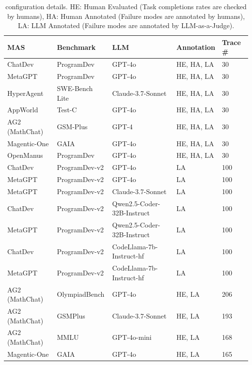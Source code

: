 \begin{table}[ht]
\small
\renewcommand{\arraystretch}{1.3} %
\setlength{\tabcolsep}{3pt} %
\centering
\caption{\dataset{} configuration details. HE: Human Evaluated (Task completions rates are checked by humans), HA: Human Annotated (Failure modes are annotated by humans), LA: LLM Annotated (Failure modes are annotated by LLM-as-a-Judge).}
\label{tab:mad}
\begin{tabular}{p{2.5cm} p{2.5cm} p{4cm} p{2cm} p{1cm}}
    \toprule
    \textbf{MAS} & \textbf{Benchmark} & \textbf{LLM} & \textbf{Annotation} & \textbf{Trace \#} \\
    \toprule
    ChatDev & ProgramDev & GPT-4o & HE, HA, LA & 30 \\
    \hline
    MetaGPT & ProgramDev & GPT-4o & HE, HA, LA & 30 \\
    \hline
    HyperAgent & SWE-Bench Lite & Claude-3.7-Sonnet  & HE, HA, LA & 30 \\
    \hline
    AppWorld & Test-C & GPT-4o & HE, HA, LA & 30 \\
    \hline
    AG2 (MathChat) & GSM-Plus & GPT-4 & HE, HA, LA & 30 \\
    \hline
    Magentic-One & GAIA & GPT-4o & HE, HA, LA & 30 \\
    \hline
    OpenManus & ProgramDev & GPT-4o & HE, HA, LA & 30 \\
    \toprule
    ChatDev & ProgramDev-v2 & GPT-4o & LA & 100 \\
    \hline
    MetaGPT & ProgramDev-v2 & GPT-4o & LA & 100 \\
    \hline
    MetaGPT & ProgramDev-v2 & Claude-3.7-Sonnet & LA & 100 \\
    \toprule
    ChatDev & ProgramDev-v2 & Qwen2.5-Coder-32B-Instruct & LA & 100 \\
    \hline
    MetaGPT & ProgramDev-v2 & Qwen2.5-Coder-32B-Instruct & LA & 100 \\
    \hline
    ChatDev & ProgramDev-v2 & CodeLlama-7b-Instruct-hf & LA & 100 \\
    \hline
    MetaGPT & ProgramDev-v2 & CodeLlama-7b-Instruct-hf & LA & 100 \\
    \toprule
    AG2 (MathChat) & OlympiadBench & GPT-4o &  HE, LA & 206 \\
    \hline
     AG2 (MathChat) & GSMPlus & Claude-3.7-Sonnet & HE, LA & 193 \\
    \hline
    AG2 (MathChat) & MMLU & GPT-4o-mini & HE, LA & 168 \\
    \hline
    Magentic-One & GAIA & GPT-4o & HE, LA & 165 \\
    \hline
\end{tabular}
\end{table}


